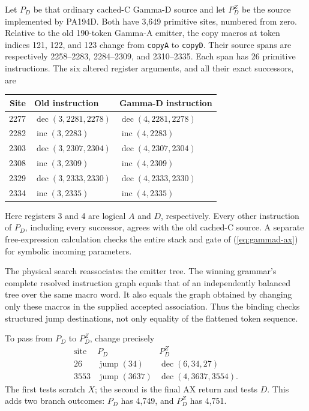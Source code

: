 Let \(P_D\) be that ordinary cached-C Gamma-D source and let
\(P_D^Z\) be the source implemented by PA194D.  Both have 3,649
primitive sites, numbered from zero.  Relative to the old 190-token
Gamma-A emitter, the copy macros at token indices 121, 122, and 123
change from \texttt{copyA} to \texttt{copyD}.  Their source spans
are respectively 2258--2283, 2284--2309, and 2310--2335.
Each span has 26 primitive instructions.  The six altered register
arguments, and all their exact successors, are
\begin{center}\small
\begin{tabular}{@{}rll@{}}
\toprule
Site & Old instruction & Gamma-D instruction\\
\midrule
2277 & \(\operatorname{dec}(3,2281,2278)\) & \(\operatorname{dec}(4,2281,2278)\)\\
2282 & \(\operatorname{inc}(3,2283)\) & \(\operatorname{inc}(4,2283)\)\\
2303 & \(\operatorname{dec}(3,2307,2304)\) & \(\operatorname{dec}(4,2307,2304)\)\\
2308 & \(\operatorname{inc}(3,2309)\) & \(\operatorname{inc}(4,2309)\)\\
2329 & \(\operatorname{dec}(3,2333,2330)\) & \(\operatorname{dec}(4,2333,2330)\)\\
2334 & \(\operatorname{inc}(3,2335)\) & \(\operatorname{inc}(4,2335)\)\\
\bottomrule
\end{tabular}
\end{center}
Here registers 3 and 4 are logical \(A\) and \(D\), respectively.
Every other instruction of \(P_D\), including every successor,
agrees with the old cached-C source.  A separate free-expression
calculation checks the entire stack and gate of
(\ref{eq:gammad-ax}) for symbolic incoming parameters.

The physical search reassociates the emitter tree.  The winning
grammar's complete resolved instruction graph equals that of an
independently balanced tree over the same macro word.  It also equals
the graph obtained by changing only these macros in the supplied
accepted association.  Thus the binding checks structured jump
destinations, not only equality of the flattened token sequence.

To pass from \(P_D\) to \(P_D^Z\), change precisely
\[
\begin{array}{c|cc}
\text{site}&P_D&P_D^Z\\ \hline
26&\operatorname{jump}(34)&\operatorname{dec}(6,34,27)\\
3553&\operatorname{jump}(3637)&\operatorname{dec}(4,3637,3554).
\end{array}
\]
The first tests scratch \(X\); the second is the final AX return
and tests \(D\).  This adds two branch outcomes: \(P_D\) has
4,749, and \(P_D^Z\) has 4,751.

